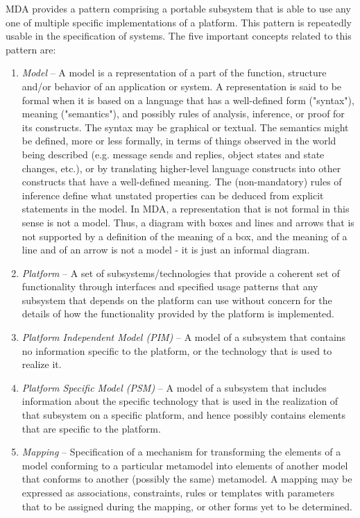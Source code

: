 MDA provides a pattern comprising a portable subsystem that is able to use any one of multiple specific implementations of a platform. This pattern is repeatedly usable in the specification of systems. The five important concepts related to this pattern are:

\begin{enumerate}
\item \textit{Model} -- A model is a representation of a part of the function, structure and/or behavior of an application or system. A representation is said to be formal when it is based on a language that has a well-defined form ("syntax"), meaning ("semantics"), and possibly rules of analysis, inference, or proof for its constructs. The syntax may be graphical or textual. The semantics might be defined, more or less formally, in terms of things observed in the world being described (e.g. message sends and replies, object states and state changes, etc.), or by translating higher-level language constructs into other constructs that have a well-defined meaning. The (non-mandatory) rules of inference define what unstated properties can be deduced from explicit statements in the model. In MDA, a representation that is not formal in this sense is not a model. Thus, a diagram with boxes and lines and arrows that is not supported by a definition of the meaning of a box, and the meaning of a line and of an arrow is not a model - it is just an informal diagram.
\item \textit{Platform} -- A set of subsystems/technologies that provide a coherent set of functionality through interfaces and specified usage patterns that any subsystem that depends on the platform can use without concern for the details of how the functionality provided by the platform is implemented.
\item \textit{Platform Independent Model (PIM)} -- A model of a subsystem that contains no information specific to the platform, or the technology that is used to realize it.
\item \textit{Platform Specific Model (PSM)} -- A model of a subsystem that includes information about the specific technology that is used in the realization of that subsystem on a specific platform, and hence possibly contains elements that are specific to the platform.
\item \textit{Mapping} -- Specification of a mechanism for transforming the elements of a model conforming to a particular metamodel into elements of another model that conforms to another (possibly the same) metamodel. A mapping may be expressed as associations, constraints, rules or templates with parameters that to be assigned during the mapping, or other forms yet to be determined.
\end{enumerate}

